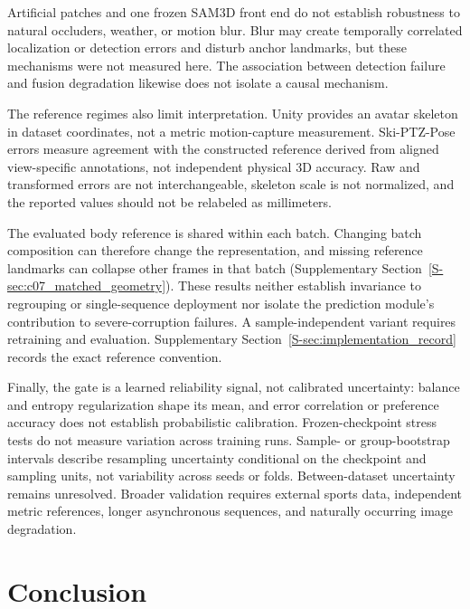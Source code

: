 \documentclass[preprint,12pt]{elsarticle}
\begin{document}
Artificial patches and one frozen SAM3D front end do not establish robustness to natural occluders, weather, or motion blur. Blur may create temporally correlated localization or detection errors and disturb anchor landmarks, but these mechanisms were not measured here. The association between detection failure and fusion degradation likewise does not isolate a causal mechanism.

The reference regimes also limit interpretation. Unity provides an avatar skeleton in dataset coordinates, not a metric motion-capture measurement. Ski-PTZ-Pose errors measure agreement with the constructed reference derived from aligned view-specific annotations, not independent physical 3D accuracy. Raw and transformed errors are not interchangeable, skeleton scale is not normalized, and the reported values should not be relabeled as millimeters.

The evaluated body reference is shared within each batch. Changing batch composition can therefore change the representation, and missing reference landmarks can collapse other frames in that batch (Supplementary Section~\ref{S-sec:c07_matched_geometry}). These results neither establish invariance to regrouping or single-sequence deployment nor isolate the prediction module's contribution to severe-corruption failures. A sample-independent variant requires retraining and evaluation. Supplementary Section~\ref{S-sec:implementation_record} records the exact reference convention.

Finally, the gate is a learned reliability signal, not calibrated uncertainty: balance and entropy regularization shape its mean, and error correlation or preference accuracy does not establish probabilistic calibration. Frozen-checkpoint stress tests do not measure variation across training runs. Sample- or group-bootstrap intervals describe resampling uncertainty conditional on the checkpoint and sampling units, not variability across seeds or folds. Between-dataset uncertainty remains unresolved. Broader validation requires external sports data, independent metric references, longer asynchronous sequences, and naturally occurring image degradation.

\section{Conclusion}
\label{sec:conclusion}
\end{document}
